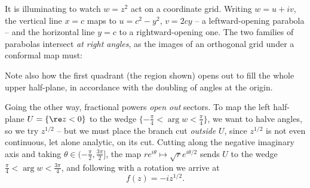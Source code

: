 It is illuminating to watch $w = z^2$ act on a coordinate grid. Writing $w = u + iv$, the vertical line $x = c$ maps to $u = c^2 - y^2$, $v = 2cy$ -- a leftward-opening parabola -- and the horizontal line $y = c$ to a rightward-opening one. The two families of parabolas intersect \emph{at right angles}, as the images of an orthogonal grid under a conformal map must:
\begin{center}
\end{center}
Note also how the first quadrant (the region shown) opens out to fill the whole upper half-plane, in accordance with the doubling of angles at the origin.

Going the other way, fractional powers \emph{open out} sectors. To map the left half-plane $U = \{ \re z < 0\}$ to the wedge $\{-\frac{\pi}{4} < \arg w < \frac{\pi}{4}\}$, we want to halve angles, so we try $z^{1/2}$ -- but we must place the branch cut \emph{outside} $U$, since $z^{1/2}$ is not even continuous, let alone analytic, on its cut. Cutting along the negative imaginary axis and taking $\theta \in (-\frac{\pi}{2}, \frac{3\pi}{2}]$, the map $re^{i\theta} \mapsto \sqrt{r} e^{i\theta/2}$ sends $U$ to the wedge $\frac{\pi}{4} < \arg w < \frac{3\pi}{4}$, and following with a rotation we arrive at
$$
f(z) = -i z^{1/2}.
$$

